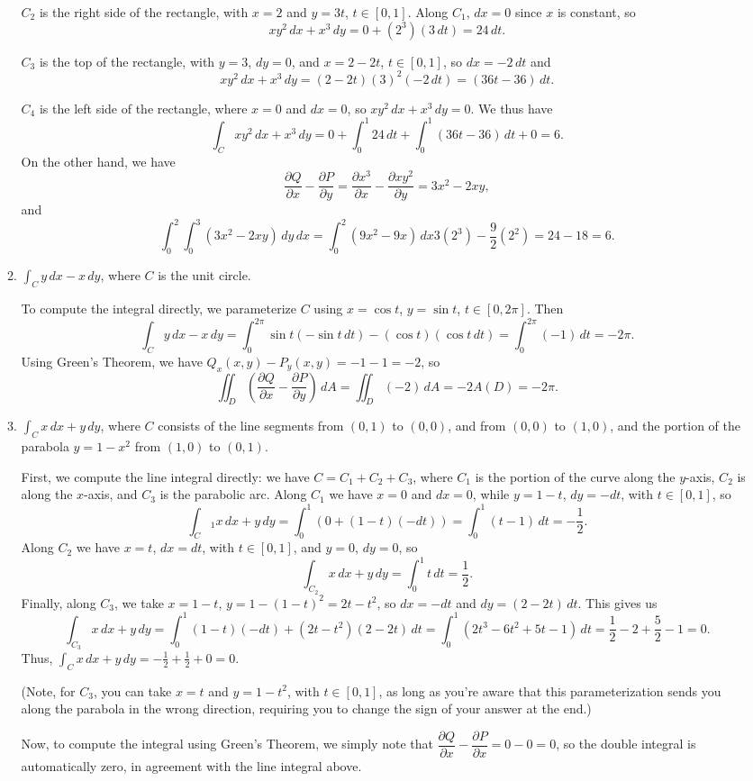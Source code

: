 \documentclass[letterpaper,12pt]{article}
\newcommand{\pd}[2]{\dfrac{\partial #1}{\partial #2}}
\begin{document}
\begin{enumerate}
\begin{enumerate}
$C_2$ is the right side of the rectangle, with $x=2$ and $y=3t$, $t\in [0,1]$. Along $C_1$, $dx=0$ since $x$ is constant, so
\[
 xy^2\,dx + x^3\,dy = 0 + (2^3)(3\,dt) = 24\,dt.
\]

$C_3$ is the top of the rectangle, with $y=3$, $dy=0$, and $x=2-2t$, $t\in [0,1]$, so $dx= -2\,dt$ and
\[
 xy^2\,dx+x^3\,dy = (2-2t)(3)^2(-2\,dt) = (36t-36)\,dt.
\]

$C_4$ is the left side of the rectangle, where $x=0$ and $dx=0$, so $xy^2\,dx+x^3\,dy = 0$. We thus have
\[
 \int_C xy^2\,dx+x^3\,dy = 0+\int_0^1 24\,dt + \int_0^1 (36t-36)\,dt + 0 = 6.
\]
On the other hand, we have
\[
 \pd{Q}{x}-\pd{P}{y} = \pd{x^3}{x}-\pd{xy^2}{y} = 3x^2-2xy,
\]
and
\[
 \int_0^2\int_0^3 (3x^2-2xy)\,dy\,dx = \int_0^2 (9x^2-9x)\,dx 3(2^3)-\frac{9}{2}(2^2) = 24-18=6.
\]

 \item $\int_C y\,dx-x\,dy$, where $C$ is the unit circle.

\bigskip

To compute the integral directly, we parameterize $C$ using $x=\cos t$, $y=\sin t$, $t\in [0,2\pi]$. Then
\[
 \int_C y\,dx-x\,dy = \int_0^{2\pi}\sin t(-\sin t\,dt)-(\cos t)(\cos t\,dt) = \int_0^{2\pi}(- 1)\,dt = -2\pi.
\]
Using Green's Theorem, we have $Q_x(x,y)-P_y(x,y) = -1-1=-2$, so
\[
 \iint_D\left(\pd{Q}{x}-\pd{P}{y}\right)\,dA = \iint_D(-2)\,dA = -2A(D) = -2\pi.
\]

 \item $\int_C x\,dx+y\,dy$, where $C$ consists of the line segments from $(0,1)$ to $(0,0)$, and from $(0,0)$ to $(1,0)$, and the portion of the parabola $y=1-x^2$ from $(1,0)$ to $(0,1)$.

\bigskip

First, we compute the line integral directly: we have $C=C_1+C_2+C_3$, where $C_1$ is the portion of the curve along the $y$-axis, $C_2$ is along the $x$-axis, and $C_3$ is the parabolic arc. Along $C_1$ we have $x=0$ and $dx=0$, while $y=1-t$, $dy = -dt$, with $t\in [0,1]$, so
\[
 \int_C{_1}x\,dx+y\,dy = \int_0^1 (0+(1-t)(-dt)) = \int_0^1 (t-1)\,dt = -\frac{1}{2}.
\]
Along $C_2$ we have $x=t$, $dx=dt$, with $t\in [0,1]$, and $y=0$, $dy=0$, so
\[
 \int_{C_2}x\,dx+y\,dy = \int_0^1 t\,dt = \frac{1}{2}.
\]
Finally, along $C_3$, we take $x=1-t$, $y=1-(1-t)^2 = 2t-t^2$, so $dx = -dt$ and $dy = (2-2t)\,dt$. This gives us
\[
 \int_{C_3} x\,dx+y\,dy = \int_0^1 (1-t)(-dt)+(2t-t^2)(2-2t)\,dt = \int_0^1 (2t^3-6t^2+5t-1)\,dt = \frac{1}{2}-2+\frac{5}{2}-1 = 0.
\]
Thus, $\int_C x\,dx+y\,dy = -\frac{1}{2}+\frac{1}{2}+0 = 0.$

(Note, for $C_3$, you can take $x=t$ and $y=1-t^2$, with $t\in [0,1]$, as long as you're aware that this parameterization sends you along the parabola in the wrong direction, requiring you to change the sign of your answer at the end.)

Now, to compute the integral using Green's Theorem, we simply note that $\pd{Q}{x}-\pd{P}{x} = 0-0 = 0$, so the double integral is automatically zero, in agreement with the line integral above.
\end{enumerate}

\end{enumerate}
\end{document}

